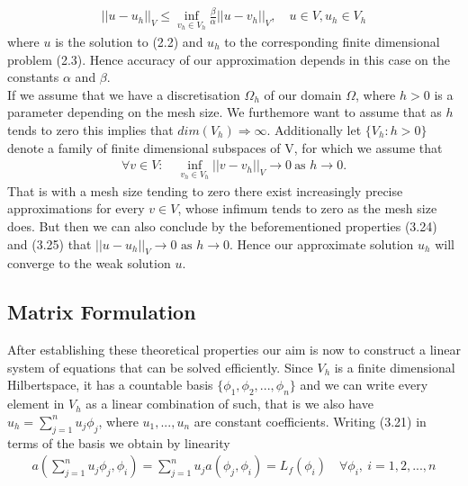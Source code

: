 \documentclass[../draft_1.tex]{subfiles}
\begin{document}
\begin{equation}
\begin{aligned}
|| u - u_h ||_V \leq \inf_{v_h \in V_h} \frac{\beta}{\alpha} || u - v_h ||_V, \quad u \in V, u_h \in V_h
\end{aligned}
\end{equation}
where $u$ is the solution to (2.2) and $u_h$ to the corresponding finite dimensional problem (2.3). Hence accuracy of our approximation depends in this case on the constants $\alpha$ and $\beta$. 
\bigskip
\\ 
If we assume that we have a discretisation $\Omega_h$ of our domain $\Omega$, where $h > 0$ is a parameter depending on the mesh size.  We furthemore want to assume that as $h$ tends to zero this implies that $dim(V_h) \Rightarrow \infty$. Additionally let $\{V_h : h > 0\}$ denote a family of finite dimensional subspaces of V, for which we assume that
\begin{equation}
\begin{aligned}
\forall v \in V : \quad \inf_{v_h \in V_h} || v - v_h||_V \rightarrow 0 \ \text{as } h \rightarrow 0.
\end{aligned}
\end{equation}
That is with a mesh size tending to zero there exist increasingly precise approximations for every $v \in V$, whose infimum tends to zero as the mesh size does. But then we can also conclude by  the beforementioned properties (3.24) and (3.25) that $|| u - u_h||_V \rightarrow 0 \text{ as } h \rightarrow 0$. Hence our approximate solution $u_h$ will converge to the weak solution $u$. 

\subsection{Matrix Formulation}
After establishing these theoretical properties our aim is now to construct a linear system of equations that can be solved efficiently. Since $V_h$ is a finite dimensional Hilbertspace, it has a countable basis $\{\phi_1, \phi_2, ..., \phi_n \}$ and we can write every element in $V_h$ as a linear combination of such, that is we also have $u_h = \sum_{j=1}^{n} u_j \phi_j$, where $u_1, ..., u_n$ are constant coefficients. Writing (3.21) in terms of the basis we obtain by linearity
\begin{equation}
\begin{aligned}
a(\sum_{j=1}^{n} u_j \phi_j, \phi_i) = \sum_{j=1}^{n} u_j a(\phi_j, \phi_i) = L_f(\phi_i) \quad \forall \phi_i, \ i = 1, 2, ..., n 
\end{aligned}
\end{equation}
\end{document}
